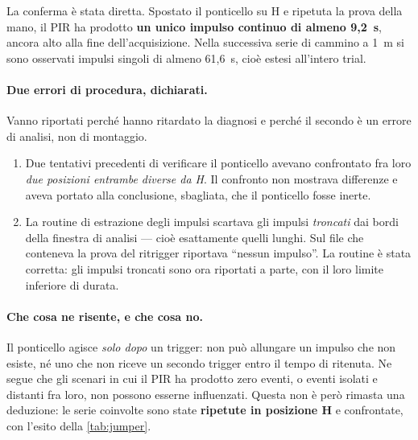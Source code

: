 La conferma è stata diretta. Spostato il ponticello su H e ripetuta la prova della
mano, il PIR ha prodotto \textbf{un unico impulso continuo di almeno 9,2~s}, ancora
alto alla fine dell'acquisizione. Nella successiva serie di cammino a 1~m si sono
osservati impulsi singoli di almeno 61,6~s, cioè estesi all'intero trial.

\paragraph{Due errori di procedura, dichiarati.} Vanno riportati perché hanno
ritardato la diagnosi e perché il secondo è un errore di analisi, non di montaggio.

\begin{enumerate}[leftmargin=1.8em,itemsep=3pt]
  \item Due tentativi precedenti di verificare il ponticello avevano confrontato fra
        loro \emph{due posizioni entrambe diverse da H}. Il confronto non mostrava
        differenze e aveva portato alla conclusione, sbagliata, che il ponticello
        fosse inerte.
  \item La routine di estrazione degli impulsi scartava gli impulsi \emph{troncati}
        dai bordi della finestra di analisi --- cioè esattamente quelli lunghi. Sul
        file che conteneva la prova del ritrigger riportava ``nessun impulso''. La
        routine è stata corretta: gli impulsi troncati sono ora riportati a parte,
        con il loro limite inferiore di durata.
\end{enumerate}

\paragraph{Che cosa ne risente, e che cosa no.} Il ponticello agisce
\emph{solo dopo} un trigger: non può allungare un impulso che non esiste, né uno che
non riceve un secondo trigger entro il tempo di ritenuta. Ne segue che gli scenari in
cui il PIR ha prodotto zero eventi, o eventi isolati e distanti fra loro, non possono
esserne influenzati. Questa non è però rimasta una deduzione: le serie coinvolte sono
state \textbf{ripetute in posizione H} e confrontate, con l'esito della
\cref{tab:jumper}.


